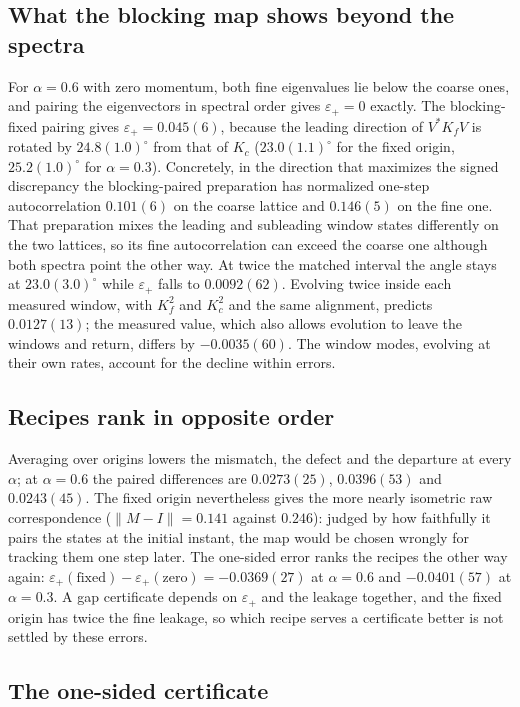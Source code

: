 \documentclass[11pt]{article}
\newcommand{\eps}{\varepsilon}
\begin{document}
\subsection{What the blocking map shows beyond the spectra}

For $\alpha=0.6$ with zero momentum, both fine eigenvalues lie below the coarse ones, and pairing the
eigenvectors in spectral order gives $\eps_+=0$ exactly. The blocking-fixed pairing gives
$\eps_+=0.045(6)$, because the leading direction of $V^*K_fV$ is rotated by $24.8(1.0)^\circ$ from that of
$K_c$ ($23.0(1.1)^\circ$ for the fixed origin, $25.2(1.0)^\circ$ for $\alpha=0.3$). Concretely, in the
direction that maximizes the signed discrepancy the blocking-paired preparation has normalized one-step
autocorrelation $0.101(6)$ on the coarse lattice and $0.146(5)$ on the fine one. That preparation mixes
the leading and subleading window states differently on the two lattices, so its fine autocorrelation
can exceed the coarse one although both spectra point the other way. At twice the matched
interval the angle stays at $23.0(3.0)^\circ$ while $\eps_+$ falls to $0.0092(62)$. Evolving twice inside
each measured window, with $K_f^2$ and $K_c^2$ and the same alignment, predicts $0.0127(13)$; the measured
value, which also allows evolution to leave the windows and return, differs by $-0.0035(60)$. The window
modes, evolving at their own rates, account for the decline within errors.

\subsection{Recipes rank in opposite order}

Averaging over origins lowers the mismatch, the defect and the departure at every $\alpha$; at
$\alpha=0.6$ the paired differences are $0.0273(25)$, $0.0396(53)$ and $0.0243(45)$. The fixed origin
nevertheless gives the more nearly isometric raw correspondence ($\|M-I\|=0.141$ against $0.246$): judged
by how faithfully it pairs the states at the initial instant, the map would be chosen wrongly for
tracking them one step later. The one-sided error ranks the recipes the other way again:
$\eps_+(\text{fixed})-\eps_+(\text{zero})=-0.0369(27)$ at $\alpha=0.6$ and $-0.0401(57)$ at $\alpha=0.3$.
A gap certificate depends on $\eps_+$ and the leakage together, and the fixed origin has twice the fine
leakage, so which recipe serves a certificate better is not settled by these errors.

\subsection{The one-sided certificate}
\end{document}
